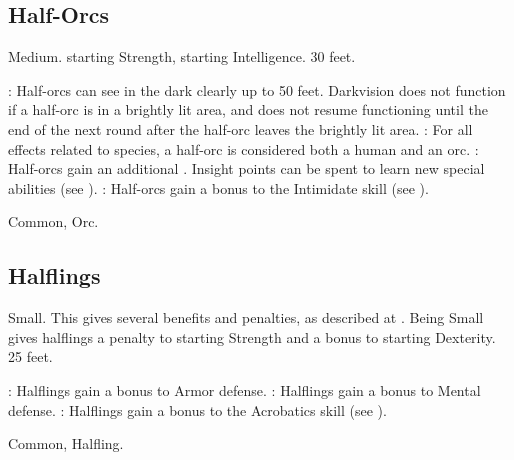 \subsection{Half-Orcs}
 Medium.
  starting Strength,  starting Intelligence.
 30 feet.
\begin{itemize}
    : Half-orcs can see in the dark clearly up to 50 feet. Darkvision does not function if a half-orc is in a brightly lit area, and does not resume functioning until the end of the next round after the half-orc leaves the brightly lit area.
    : For all effects related to species, a half-orc is considered both a human and an orc.
    : Half-orcs gain an additional .
        Insight points can be spent to learn new special abilities (see ).
    : Half-orcs gain a  bonus to the Intimidate skill (see ).
\end{itemize}
 Common, Orc.

\subsection{Halflings}
 Small. This gives several benefits and penalties, as described at .
 Being Small gives halflings a  penalty to starting Strength and a  bonus to starting Dexterity.
 25 feet.
\begin{itemize}
    : Halflings gain a  bonus to Armor defense.
    : Halflings gain a  bonus to Mental defense.
    : Halflings gain a  bonus to the Acrobatics skill (see ).
\end{itemize}
 Common, Halfling.
